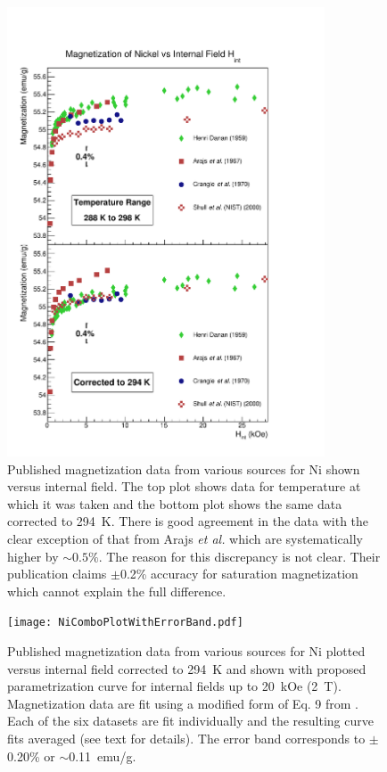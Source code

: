 \documentclass[preprint,12pt]{elsarticle}
\begin{document}
\begin{figure}
\centering
\includegraphics[width=0.84\textwidth]{NiMagnetization_vs_Hint.pdf}
\caption{Published magnetization data from various sources for Ni shown versus internal field. The top plot shows data for temperature at which it was taken and the bottom plot shows the same data corrected to 294~K. There is good agreement in the data with the clear exception of that from Arajs {\it et al.} which are systematically higher by $\sim0.5\%$. The reason for this discrepancy is not clear. Their publication claims $\pm$0.2\% accuracy for saturation magnetization which cannot explain the full difference.}
\label{fig:mag_Ni}
\end{figure}
\begin{figure}
\centering
\texttt{[image: NiComboPlotWithErrorBand.pdf]}
\caption{Published magnetization data from various sources for Ni plotted versus internal field corrected to 294~K and shown with proposed parametrization curve for internal fields up to 20~kOe (2~T). Magnetization data are fit using a modified form of Eq. 9 from \cite{PauthenetMar1982}. Each of the six datasets are fit individually and the resulting curve fits averaged (see text for details). The error band corresponds to $\pm$0.20\% or $\sim$0.11~{\rm emu/g}.}
\label{fig:mag_errorband_Ni}
\end{figure}
\FloatBarrier
\end{document}
